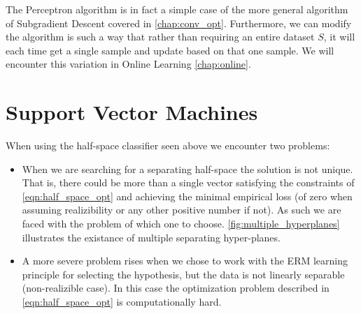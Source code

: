 \begin{remark}
The Perceptron algorithm is in fact a simple case of the more general algorithm of Subgradient Descent covered in \autoref{chap:conv_opt}. Furthermore, we can modify the algorithm is such a way that rather than requiring an entire dataset $S$, it will each time get a single sample and update based on that one sample. We will encounter this variation in Online Learning \autoref{chap:online}.
\end{remark}


\section{Support Vector Machines}
When using the half-space classifier seen above we encounter two problems:
\begin{itemize}
	\item When we are searching for a separating half-space the solution is not unique. That is, there could be more than a single vector satisfying the constraints of \ref{eqn:half_space_opt} and achieving the minimal empirical loss (of zero when assuming realizibility or any other positive number if not). As such we are faced with the problem of which one to choose. \autoref{fig:multiple_hyperplanes} illustrates the existance of multiple separating hyper-planes. \\
	\item A more severe problem rises when we chose to work with the ERM learning principle for selecting the hypothesis, but the data is not linearly separable (non-realizible case). In this case the optimization problem described in \ref{eqn:half_space_opt} is computationally hard.
\end{itemize}


